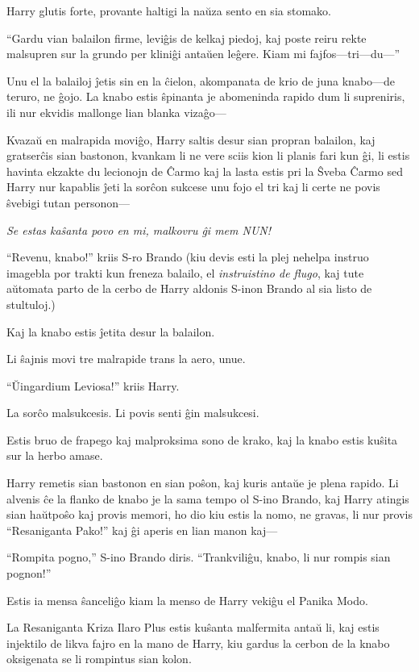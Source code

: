 Harry glutis forte, provante haltigi la naŭza sento en sia stomako.

``Gardu vian balailon firme, leviĝis de kelkaj piedoj, kaj poste reiru
rekte malsupren sur la grundo per kliniĝi antaŭen leĝere. Kiam mi
fajfos—tri—du—''

Unu el la balailoj ĵetis sin en la ĉielon, akompanata de krio de juna
knabo—de teruro, ne ĝojo. La knabo estis ŝpinanta je abomeninda rapido
dum li supreniris, ili nur ekvidis mallonge lian blanka vizaĝo—

Kvazaŭ en malrapida moviĝo, Harry saltis desur sian propran balailon,
kaj gratserĉis sian bastonon, kvankam li ne vere sciis kion li planis
fari kun ĝi, li estis havinta ekzakte du lecionojn de Ĉarmo kaj la
lasta estis pri la Ŝveba Ĉarmo sed Harry nur kapablis ĵeti la sorĉon
sukcese unu fojo el tri kaj li certe ne povis ŝvebigi tutan personon—

\emph{Se estas kaŝanta povo en mi, malkovru ĝi mem NUN!}

``Revenu, knabo!'' kriis S-ro Brando (kiu devis esti la plej nehelpa
instruo imagebla por trakti kun freneza balailo, el \emph{instruistino
de flugo}, kaj tute aŭtomata parto de la cerbo de Harry aldonis S-inon
Brando al sia listo de stultuloj.)

Kaj la knabo estis ĵetita desur la balailon.

Li ŝajnis movi tre malrapide trans la aero, unue.

``Ŭingardium Leviosa!'' kriis Harry.

La sorĉo malsukcesis. Li povis senti ĝin malsukcesi.

Estis bruo de frapego kaj malproksima sono de krako, kaj la knabo
estis kuŝita sur la herbo amase.

Harry remetis sian bastonon en sian poŝon, kaj kuris antaŭe je plena
rapido. Li alvenis ĉe la flanko de knabo je la sama tempo ol S-ino
Brando, kaj Harry atingis sian haŭtpoŝo kaj provis memori, ho dio kiu
estis la nomo, ne gravas, li nur provis ``Resaniganta Pako!'' kaj ĝi
aperis en lian manon kaj—

``Rompita pogno,'' S-ino Brando diris. ``Trankviliĝu, knabo, li nur
rompis sian pognon!''

Estis ia mensa ŝanceliĝo kiam la menso de Harry vekiĝu el Panika
Modo.

La Resaniganta Kriza Ilaro Plus estis kuŝanta malfermita antaŭ li, kaj
estis injektilo de likva fajro en la mano de Harry, kiu gardus la
cerbon de la knabo oksigenata se li rompintus sian kolon.

